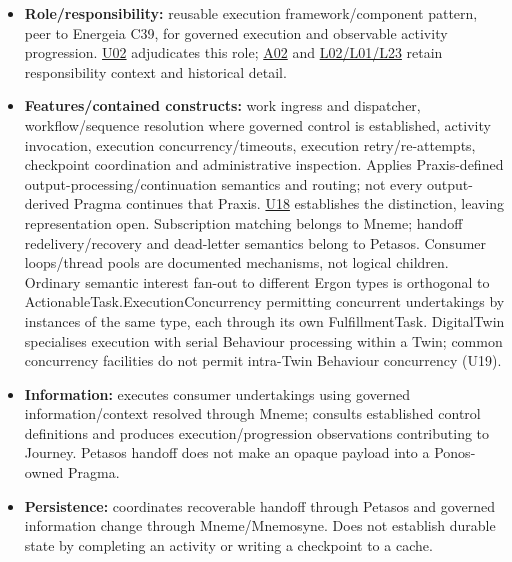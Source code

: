 \begin{itemize}


\item \textbf{Role/responsibility:} reusable execution framework/component pattern, peer
  to Energeia C39, for governed execution and observable activity progression.
  \href{\detokenize{../../../../../../../../docs/markdown/05-information-systems-architecture/sources.md#u02}}{U02} adjudicates this role; \href{\detokenize{../../../../../../../../docs/markdown/05-information-systems-architecture/sources.md#a02}}{A02} and
  \href{\detokenize{../../../../../../../../docs/markdown/05-information-systems-architecture/sources.md#l02}}{L02/L01/L23} retain responsibility context and historical detail.

\item \textbf{Features/contained constructs:} work ingress and dispatcher, workflow/sequence
  resolution where governed control is established, activity invocation, execution
  concurrency/timeouts, execution retry/re-attempts, checkpoint coordination and
  administrative inspection. Applies Praxis-defined output-processing/continuation
  semantics and routing; not every output-derived Pragma continues that Praxis.
  \href{\detokenize{../../../../../../../../docs/markdown/05-information-systems-architecture/sources.md#u18}}{U18} establishes the distinction, leaving representation open.
  Subscription matching belongs to Mneme; handoff
  redelivery/recovery and dead-letter semantics belong to Petasos.
  Consumer loops/thread pools are documented mechanisms, not logical children.
  Ordinary semantic interest fan-out to different Ergon types is orthogonal to
  ActionableTask.ExecutionConcurrency permitting concurrent undertakings by
  instances of the same type, each through its own FulfillmentTask. DigitalTwin
  specialises execution with serial Behaviour processing within a Twin; common
  concurrency facilities do not permit intra-Twin Behaviour concurrency (U19).

\item \textbf{Information:} executes consumer undertakings using governed information/context
  resolved through Mneme; consults established control definitions and produces
  execution/progression observations contributing to Journey. Petasos handoff
  does not make an opaque payload into a Ponos-owned Pragma.

\item \textbf{Persistence:} coordinates recoverable handoff through Petasos and governed
  information change through Mneme/Mnemosyne. Does not establish durable state
  by completing an activity or writing a checkpoint to a cache.


\end{itemize}
